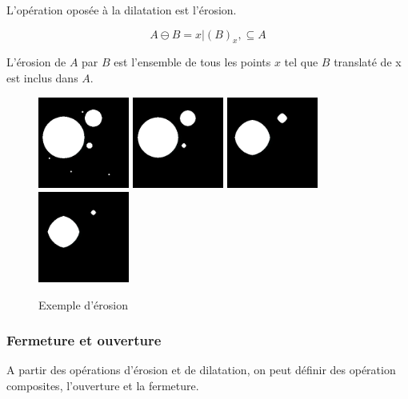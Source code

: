 L'opération oposée à la dilatation est l'érosion.

\begin{equation}
  A \ominus B = {x|(B)_x, \subseteq A}
\end{equation}

L'érosion de $A$ par $B$ est l'ensemble de tous les points $x$ tel que $B$ translaté de x est inclus dans $A$. 

\begin{figure}
  \centering
  \includegraphics[height=3cm]{Images/morpho_init.png}
  \includegraphics[height=3cm]{Images/morpho_erode_k5.png}
  \includegraphics[height=3cm]{Images/morpho_erode_k21.png}
  \includegraphics[height=3cm]{Images/morpho_erode_k31.png}
  \label{fig:morpho_erosion}
  \caption{Exemple d'érosion}
\end{figure}

\subsubsection{Fermeture et ouverture}

A partir des opérations d'érosion et de dilatation, on peut définir des opération composites, l'ouverture et la fermeture.

